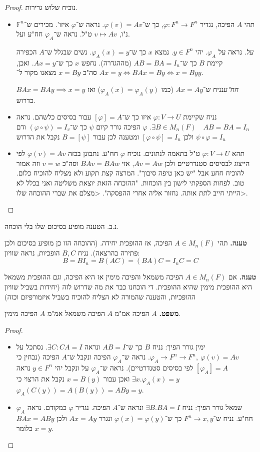\documentclass[]{article}
\newcommand\F         {\mathbb{F}}
\newcommand\co        {\colon}
\renewcommand\phi     {\varphi}
\begin{document}
	\begin{proof}
		נוכיח שלוש גרירות. 
		\begin{itemize}
			\item תהי $A$ הפיכה, נגדיר $\phi \co F^n \to F^n$, כך ש־$\phi(v) = Av$. נראה ש־$\phi$ איזו'. מכירים ש־$\F^n$ נ"ו, $v \mapsto Av$ ט"ל. 
			נראה ש־$\phi_A$ חח"ע ועל. 
			
			\textit{על. }נראה על $\phi_A$. יהי $y \in F^n$. נמצא $x$ כך ש־$\phi_A(x) = y$. נשים שבגלל ש־$A$ הכפירה קיימת $B$ כך ש־$AB = BA = I_n$ (מההגדרה). נחפש $x$ כך ש־$Ax = y$. ואכן, $Ax = y \iff BAx = By \iff x = By$ סה"כ $x = By$ מצאנו מקור ל־$y$. 
			
			\textit{חח"ע}נניח ש־$Ax = Ay$ (כמו $\phi_A(x) = \phi_A(y)$) ואז $BAx = BAy \implies x = y$ כדרוש. 
			\item נניח שקיימת $\phi \co V \to U$ איזו כך ש־$[\phi] = A$ עבור בסיסים כלשהם. נראה $\exists B \in M_{n}(F) \quad AB = BA = I_n$. $\phi$ הפיכה גורר קיום $\psi$ כך ש־$(\phi \circ \psi) = I_v$ ודם $\psi \circ \phi = I_u$ ולכן $[\phi\circ\psi] = I_n$ ומטענה לכן עבור $B = [\psi]$ נקבל את הדרוש
			
			\item תהא $\phi \co V \to U$ ט"ל בתאמה לנתונים. נוכיח $\phi$ חח"ע. נתבונן בכזה $\phi(v) = Av$ לפי הייצוג לבסיסים סטנדרטיים ולכן $Av = Aw$, אזי $BAv = BAw$ וסה"כ $v = w$ וזה אמור להוכיח חחע אבל "יש כאן טיפה סיבוך". המרצה קצת תקוע ולא מצליח להוכיח כלום. טוב. לפחות הספקתי לישון בין הוכחות. "ההוכחה הזאת יוצאת משליטה ואני בכלל לא הייתי חייב לתת אותה. נחזור אליה אחרי ההפסקה". <מצלם את שברי ההוכחה שלו>. 
		\end{itemize}
	\end{proof}
	
	נ.ב. הטענה מופיע בסיכום שלו בלי הוכחה. 
	
	\textbf{טענה. }תהי $A \in M_n(F)$ הפיכה, אז ההופכית יחידה. (ההוכחה הזו כן מופיע בסיכום ולכן פתירה בהרצאה). נניח $B, C$ הופכיות, נראה שוויון: 
	\[ B = BI_n = B(AC) = (BA)C = I_nC = C \]
	
	\textbf{טענה. }אם $A \in M_n(F)$ הפיכה משמאל והפיכה מימין אז היא הפיכה, וגם ההופכית משמאל היא ההופכית מימין שהיא ההופכית. די הוכחנו כבר את מה שדרוש לזה (יחידות בשביל שוויון ההופכיות, והטענה שהמורה לא הצליח להוכיח בשביל איזמורפיזם וכזה)
	
	\textbf{משפט. }$A$ הפיכה אמ"מ $A$ הפיכה משמאל אמ"מ $A$ הפיכה מימין. 
	
	\begin{proof}
		\begin{itemize}
			\item ימין גורר הפיך: נניח $B$ כך ש־$AB = I$ ונראה $\exists C\co CA = I$. נסתכל על $\phi_A \to F^n \to F^n, \ \phi(v) = Av$. נראה ש־$\phi_A$ הפיכה ונקבל ש־$A$ הפיכה (נבחין כי $[\phi_A] = A$ לפי בסיסים סטנדרטיים). נראה ש־$\phi_A$ על ונקבל יהי $y \in F^n$ נראה $\exists x . \phi_A(x) = y$ ואכן עבור $x = B(y)$ נקבל את הרצוי כי $\phi_A(C(y)) = A(B(y)) = ABy = y$. 
			\item שמאל גורר הפיך: נניח $\exists B. BA = I$ ונראה ש־$A$ הפיכה. נגדיר $\phi$ כמקודם. נראה $\phi_A$ חח"ע. נניח ש־$F^n \to x, y$ כך ש־$\phi(x) = \phi(y)$ ונגרר $Ax = Ay$ ולכן $BAx = ABy$  כלומר $x =y$. 
		\end{itemize}
	\end{proof}
	
\end{document}
